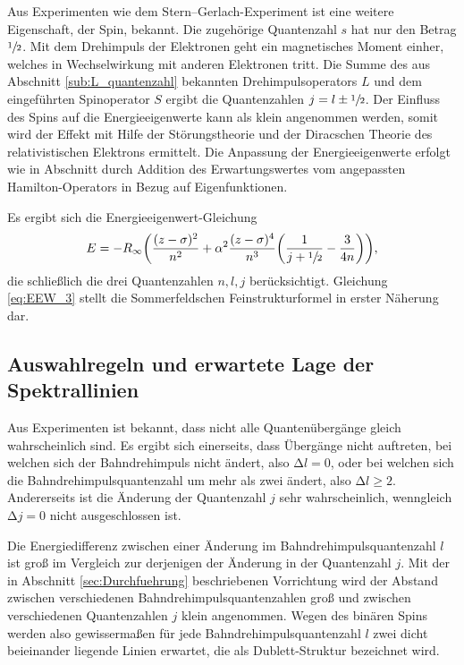 Aus Experimenten wie dem Stern--Gerlach-Experiment ist eine weitere Eigenschaft, der Spin, bekannt.
Die zugehörige Quantenzahl $s$ hat nur den Betrag $\sfrac{1}{2}$.
Mit dem Drehimpuls der Elektronen geht ein magnetisches Moment einher, welches in Wechselwirkung mit anderen Elektronen tritt.
Die Summe des aus Abschnitt \ref{sub:L_quantenzahl} bekannten Drehimpulsoperators $L$ und dem eingeführten Spinoperator $S$ ergibt die Quantenzahlen
$j=l\pm\sfrac{1}{2}$.
Der Einfluss des Spins auf die Energieeigenwerte kann als klein angenommen werden, somit wird der Effekt mit Hilfe der Störungstheorie und der Diracschen Theorie des relativistischen Elektrons ermittelt.
Die Anpassung der Energieeigenwerte erfolgt wie in Abschnitt \label{sub:rel} durch Addition des Erwartungswertes vom angepassten Hamilton-Operators in Bezug auf Eigenfunktionen.

Es ergibt sich die Energieeigenwert-Gleichung
\begin{equation}
	E=-R_\infty\biggl(\frac{(z-\sigma)^2}{n^2}+\alpha^2\frac{(z-\sigma)^4}{n^3}\biggl(\frac{1}{j+\sfrac{1}{2}}-\frac{3}{4n}\biggr) \biggr),
	\label{eq:EEW_3}
\end{equation}
die schließlich die drei Quantenzahlen $n,l,j$ berücksichtigt.
Gleichung \eqref{eq:EEW_3} stellt die Sommerfeldschen Feinstrukturformel in erster Näherung dar.

\subsection{Auswahlregeln und erwartete Lage der Spektrallinien}
Aus Experimenten ist bekannt, dass nicht alle Quantenübergänge gleich wahrscheinlich sind.
Es ergibt sich einerseits, dass Übergänge nicht auftreten, bei welchen sich der Bahndrehimpuls nicht ändert, also $\mathup\Delta l=0$, oder bei welchen sich  die Bahndrehimpulsquantenzahl um mehr als zwei ändert, also $\mathup\Delta l\ge2$.
Andererseits ist die Änderung der Quantenzahl $j$ sehr wahrscheinlich, wenngleich $\mathup\Delta j=0$ nicht ausgeschlossen ist.

Die Energiedifferenz zwischen einer Änderung im Bahndrehimpulsquantenzahl $l$ ist groß im Vergleich zur derjenigen der Änderung in der Quantenzahl $j$.
Mit der in Abschnitt \ref{sec:Durchfuehrung} beschriebenen Vorrichtung wird der Abstand zwischen verschiedenen Bahndrehimpulsquantenzahlen groß und zwischen verschiedenen Quantenzahlen $j$ klein angenommen.
Wegen des binären Spins werden also gewissermaßen für jede Bahndrehimpulsquantenzahl $l$ zwei dicht beieinander liegende Linien erwartet, die als Dublett-Struktur bezeichnet wird.

